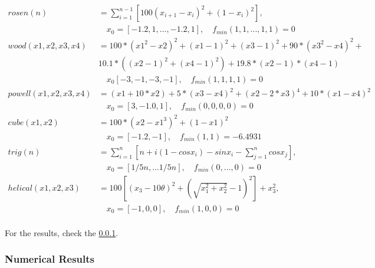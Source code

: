 \documentclass[a4paper,11pt]{article}
\numberwithin{equation}{section} %
\begin{document}
\begin{align*}
    rosen(n) &= \sum_{i=1}^{n-1} [100 (x_{i+1}-x_i)^2 + (1-x_i)^2], \\ &\quad x_0 = [-1.2,1,...,-1.2,1], \quad f_{min}(1,1,...,1,1)=0  \\
    wood(x1,x2,x3,x4) &= 100*(x1^2-x2)^2 + (x1-1)^2 + (x3-1)^2 + 90*(x3^2 - x4)^2 + \\ & 10.1*((x2-1)^2 + (x4-1)^2) + 19.8*(x2-1)*(x4-1)\\ & \quad x_0 [-3,-1,-3,-1], \quad f_{min}(1,1,1,1) = 0 \\
    powell(x1,x2,x3,x4) &= (x1+10*x2) + 5*(x3-x4)^2 + (x2-2*x3)^4 + 10*(x1-x4)^2 \\ & \quad x_0 = [3,-1.0,1], \quad f_{min}(0,0,0,0) = 0 \\
    cube(x1,x2) &= 100*(x2-x1^3)^2 + (1-x1)^2 \\ & \quad x_0 = [-1.2,-1], \quad f_{min}(1,1) = -6.4931 \\ 
    trig(n) &= \sum_{i=1}^{n}[n + i(1-cosx_i) - sinx_i - \sum_{j=1}^{n}cosx_j],\\ & \quad x_0 = [1/5n,...1/5n], \quad f_{min}(0,...,0) = 0 \\
    helical(x1,x2,x3) &= 100[(x_3-10\theta)^2 + (\sqrt{x_1^2+x_2^2}-1)^2] + x_3^2, \\ & \quad x_0 = [-1,0,0], \quad f_{min}(1,0,0) = 0 \\
\end{align*}

For the results, check the \ref{simulation2}.

\subsubsection{Numerical Results}
\label{simulation2}
\end{document}
